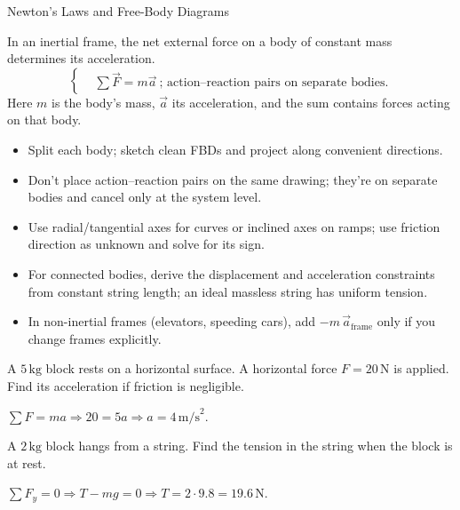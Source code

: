 \label{unit:dynamics}

\begin{KnowledgePoint}{Newton's Laws and Free-Body Diagrams \Core}
  \KPFormulas
  \begin{formulabox}
  In an inertial frame, the net external force on a body of constant mass determines its acceleration.
  \[
  \left\{\begin{aligned}
    &\sum \vec F=m\vec a\ \text{; action--reaction pairs on separate bodies}.
  \end{aligned}\right.
  \]
  Here $m$ is the body's mass, $\vec a$ its acceleration, and the sum contains forces acting on that body.
  \end{formulabox}

  \KPHeuristics
  \begin{heuristicsbox}
  \begin{itemize}[leftmargin=*]
    \item Split each body; sketch clean FBDs and project along convenient directions.
    \item Don't place action--reaction pairs on the same drawing; they're on separate bodies and cancel only at the system level.
    \item Use radial/tangential axes for curves or inclined axes on ramps; use friction direction as unknown and solve for its sign.
    \item For connected bodies, derive the displacement and acceleration constraints from constant string length; an ideal massless string has uniform tension.
    \item In non-inertial frames (elevators, speeding cars), add $-m\,\vec a_{\text{frame}}$ only if you change frames explicitly.
  \end{itemize}
  \end{heuristicsbox}

  \KPProblems
\begin{cheatproblem}
  A $5\,\text{kg}$ block rests on a horizontal surface. A horizontal force $F=20\,\text{N}$ is applied. Find its acceleration if friction is negligible.
\begin{solutionbox}
  $\sum F=ma\Rightarrow 20=5a\Rightarrow a=4\,\text{m/s}^2$.
\end{solutionbox}
\end{cheatproblem}
\begin{cheatproblem}
  A $2\,\text{kg}$ block hangs from a string. Find the tension in the string when the block is at rest.
\begin{solutionbox}
  $\sum F_y=0\Rightarrow T-mg=0\Rightarrow T=2\cdot9.8=19.6\,\text{N}$.
\end{solutionbox}
\end{cheatproblem}
\end{KnowledgePoint}

